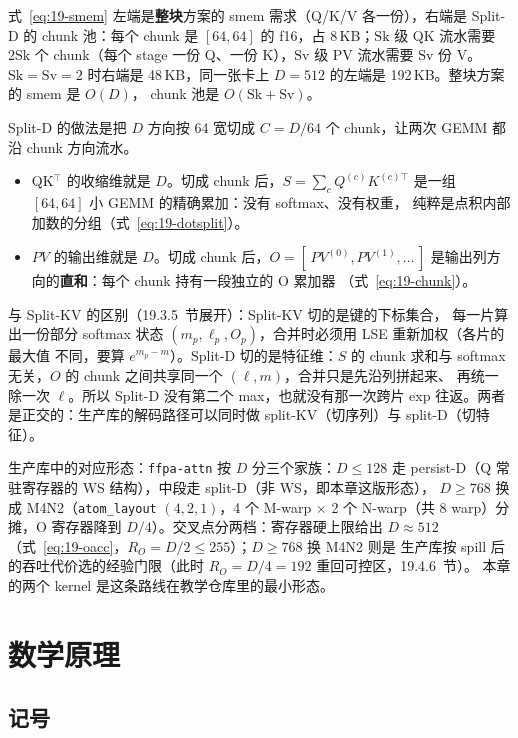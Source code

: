式~\ref{eq:19-smem} 左端是\textbf{整块}方案的 smem 需求（Q/K/V 各一份），右端是
Split-D 的 chunk 池：每个 chunk 是 $[64,64]$ 的 f16，占 8\,KB；$\mathrm{Sk}$ 级
QK 流水需要 $2\mathrm{Sk}$ 个 chunk（每个 stage 一份 Q、一份 K），$\mathrm{Sv}$
级 PV 流水需要 $\mathrm{Sv}$ 份 V。$\mathrm{Sk}=\mathrm{Sv}=2$ 时右端是
48\,KB，同一张卡上 $D=512$ 的左端是 192\,KB。整块方案的 smem 是 $O(D)$，
chunk 池是 $O(\mathrm{Sk} + \mathrm{Sv})$。

Split-D 的做法是把 $D$ 方向按 64 宽切成 $C = D/64$ 个 chunk，让两次 GEMM 都沿
chunk 方向流水。

\begin{itemize}[itemsep=2pt,topsep=2pt]
  \item QK${}^\top$ 的收缩维就是 $D$。切成 chunk 后，$S = \sum_c Q^{(c)} K^{(c)\top}$
        是一组 $[64,64]$ 小 GEMM 的精确累加：没有 softmax、没有权重，
        纯粹是点积内部加数的分组（式~\ref{eq:19-dotsplit}）。
  \item $PV$ 的输出维就是 $D$。切成 chunk 后，$O = [\,P V^{(0)}, P V^{(1)}, \dots\,]$
        是输出列方向的\textbf{直和}：每个 chunk 持有一段独立的 O 累加器
        （式~\ref{eq:19-chunk}）。
\end{itemize}

与 Split-KV 的区别（19.3.5~节展开）：Split-KV 切的是键的下标集合，
每一片算出一份部分
softmax 状态 $(m_p, \ell_p, O_p)$，合并时必须用 LSE 重新加权（各片的最大值
不同，要算 $e^{m_p - m}$）。Split-D 切的是特征维：$S$ 的 chunk 求和与 softmax
无关，$O$ 的 chunk 之间共享同一个 $(\ell, m)$，合并只是先沿列拼起来、
再统一除一次 $\ell$。所以 Split-D 没有第二个 max，也就没有那一次跨片
exp 往返。两者是正交的：生产库的解码路径可以同时做 split-KV（切序列）与
split-D（切特征）。

生产库中的对应形态：\texttt{ffpa-attn} 按 $D$ 分三个家族：$D \le 128$ 走
persist-D（Q 常驻寄存器的 WS 结构），中段走 split-D（非 WS，即本章这版形态），
$D \ge 768$ 换成 M4N2（\texttt{atom\_layout} $(4,2,1)$，4 个 M-warp $\times$ 2 个
N-warp（共 8 warp）分摊，O 寄存器降到 $D/4$）。交叉点分两档：寄存器硬上限给出
$D \approx 512$（式~\ref{eq:19-oacc}，$R_O = D/2 \le 255$）；$D \ge 768$ 换 M4N2 则是
生产库按 spill 后的吞吐代价选的经验门限（此时 $R_O = D/4 = 192$ 重回可控区，19.4.6~节）。
本章的两个 kernel 是这条路线在教学仓库里的最小形态。

\section{数学原理}

\subsection{记号}

